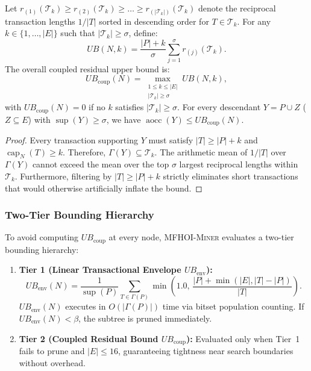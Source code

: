 \documentclass[runningheads,orivec]{llncs}
\newcommand{\supp}{\operatorname{sup}}
\newcommand{\aocc}{\operatorname{aocc}}
\newcommand{\capN}{\operatorname{cap}_N}
\newcommand{\MFHOIMiner}{\textsc{MFHOI-Miner}}
\begin{document}
\begin{theorem}
\label{thm:ub_coup}
Let $r_{(1)}(\mathcal{T}_k) \ge r_{(2)}(\mathcal{T}_k) \ge \dots \ge r_{(|\mathcal{T}_k|)}(\mathcal{T}_k)$ denote the reciprocal transaction lengths $1/|T|$ sorted in descending order for $T \in \mathcal{T}_k$.
For any $k \in \{1, \dots, |E|\}$ such that $|\mathcal{T}_k| \ge \sigma$, define:
\begin{equation}
UB(N, k) = \frac{|P| + k}{\sigma} \sum_{j=1}^{\sigma} r_{(j)}(\mathcal{T}_k).
\end{equation}
The overall coupled residual upper bound is:
\begin{equation}
UB_{\mathrm{coup}}(N) = \max_{\substack{1 \le k \le |E| \\ |\mathcal{T}_k| \ge \sigma}} UB(N, k),
\end{equation}
with $UB_{\mathrm{coup}}(N) = 0$ if no $k$ satisfies $|\mathcal{T}_k| \ge \sigma$.
For every descendant $Y = P \cup Z$ ($Z \subseteq E$) with $\supp(Y) \ge \sigma$, we have $\aocc(Y) \le UB_{\mathrm{coup}}(N)$.
\end{theorem}
\begin{proof}
Every transaction supporting $Y$ must satisfy $|T| \ge |P| + k$ and $\capN(T) \ge k$.
Therefore, $\Gamma(Y) \subseteq \mathcal{T}_k$. The arithmetic mean of $1/|T|$ over $\Gamma(Y)$ cannot exceed the mean over the top $\sigma$ largest reciprocal lengths within $\mathcal{T}_k$. Furthermore, filtering by $|T| \ge |P| + k$ strictly eliminates short transactions that would otherwise artificially inflate the bound.
\end{proof}

\subsubsection{Two-Tier Bounding Hierarchy}
To avoid computing $UB_{\mathrm{coup}}$ at every node, \MFHOIMiner{} evaluates a two-tier bounding hierarchy:
\begin{enumerate}
    \item \textbf{Tier 1 (Linear Transactional Envelope $UB_{\mathrm{env}}$):}
    \begin{equation}
    \label{eq:ub_env}
    UB_{\mathrm{env}}(N) = \frac{1}{\supp(P)} \sum_{T \in \Gamma(P)} \min\left(1.0, \, \frac{|P| + \min(|E|, |T| - |P|)}{|T|}\right).
    \end{equation}
    $UB_{\mathrm{env}}(N)$ executes in $O(|\Gamma(P)|)$ time via bitset population counting. If $UB_{\mathrm{env}}(N) < \beta$, the subtree is pruned immediately.
    \item \textbf{Tier 2 (Coupled Residual Bound $UB_{\mathrm{coup}}$):} Evaluated only when Tier~1 fails to prune and $|E| \le 16$, guaranteeing tightness near search boundaries without overhead.
\end{enumerate}
\end{document}
